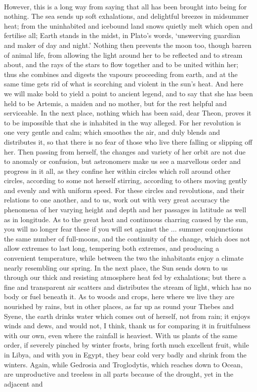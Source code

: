 \documentclass[a4paper, 11pt, oneside, polutonikogreek, english]{article}
\begin{document}
\paragraph{}
However, this is a long way from saying that all has been brought into being for nothing. The sea sends up soft exhalations, and delightful breezes in midsummer heat; from the uninhabited and icebound land snows quietly melt which open and fertilise all; Earth stands in the midst, in Plato's words, `unswerving guardian and maker of day and night.' Nothing then prevents the moon too, though barren of animal life, from allowing the light around her to be reflected and to stream about, and the rays of the stars to flow together and to be united within her; thus she combines and digests the vapours proceeding from earth, and at the same time gets rid of what is scorching and violent in the sun's heat. And here we will make bold to yield a point to ancient legend, and to say that she has been held to be Artemis, a maiden and no mother, but for the rest helpful and serviceable. In the next place, nothing which has been said, dear Theon, proves it to be impossible that she is inhabited in the way alleged. For her revolution is one very gentle and calm; which smoothes the air, and duly blends and distributes it, so that there is no fear of those who live there falling or slipping off her. Then passing from herself, the changes and variety of her orbit are not due to anomaly or confusion, but astronomers make us see a marvellous order and progress in it all, as they confine her within circles which roll around other circles, according to some not herself stirring, according to others moving gently and evenly and with uniform speed. For these circles and revolutions, and their relations to one another, and to us, work out with very great accuracy the phenomena of her varying height and depth and her passages in latitude as well as in longitude. As to the great heat and continuous charring caused by the sun, you will no longer fear these if you will set against the ... summer conjunctions the same number of full-moons, and the continuity of the change, which does not allow extremes to last long, tempering both extremes, and producing a convenient temperature, while between the two the inhabitants enjoy a climate nearly resembling our spring. In the next place, the Sun sends down to us through our thick and resisting atmosphere heat fed by exhalations; but there a fine and transparent air scatters and distributes the stream of light, which has no body or fuel beneath it. As to woods and crops, here where we live they are nourished by rains, but in other places, as far up as round your Thebes and Syene, the earth drinks water which comes out of herself, not from rain; it enjoys winds and dews, and would not, I think, thank us for comparing it in fruitfulness with our own, even where the rainfall is heaviest. With us plants of the same order, if severely pinched by winter frosts, bring forth much excellent fruit, while in Libya, and with you in Egypt, they bear cold very badly and shrink from the winters. Again, while Gedrosia and Troglodytis, which reaches down to Ocean, are unproductive and treeless in all parts because of the drought, yet in the adjacent and 
\end{document}
